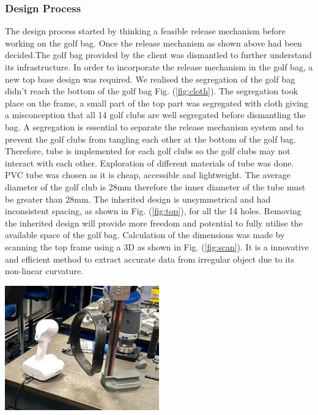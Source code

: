 \documentclass[11pt,landscape]{article}
\newenvironment{Figure}
  {\par\medskip\noindent\minipage{\linewidth}}
  {\endminipage\par\medskip}
\begin{document}
\begin{multicols}{3}
    \subsubsection{Design Process}
    The design process started by thinking a feasible release mechanism before
    working on the golf bag. Once the release mechanism as shown above had been
    decided.The golf bag provided by the client was dismantled to further
    understand its infrastructure. In order to incorporate the release mechanism
    in the golf bag, a new top base design was required. We realised the
    segregation of the golf bag didn't reach the bottom of the golf bag Fig.
    (\ref{fig:cloth}). The segregation took place on the frame, a small part of
    the top part was segregated with cloth giving a misconception that all  14
    golf clubs are well segregated before dismantling the bag. A segregation is
    essential to separate the release mechanism system and to prevent the golf
    clubs from tangling each other at the bottom of the golf bag. Therefore,
    tube is implemented for each golf clubs so the golf clubs may not interact
    with each other. Exploration of different materials of tube was done. PVC
    tube was chosen as it is cheap, accessible and lightweight. The average
    diameter of the golf club is 28mm therefore the inner diameter of the tube
    must be greater than 28mm. The inherited design is unsymmetrical and had
    inconsistent spacing, as shown in Fig. (\ref{fig:top}), for all the 14
    holes. Removing the inherited design will provide more freedom and
    potential to fully utilise the available space of the golf bag. Calculation
    of the dimensions was made by scanning the top frame using a 3D as shown in
     Fig. (\ref{fig:scan}). It is a innovative and efficient method to
    extract accurate data from irregular object due to its non-linear curvature.
    \begin{Figure}
        \begin{center}
            \includegraphics[width=0.5\textwidth]{Figure15.jpg}
            \label{fig:scan}
        \end{center}
    \end{Figure}
    

\end{multicols}
\end{document}
